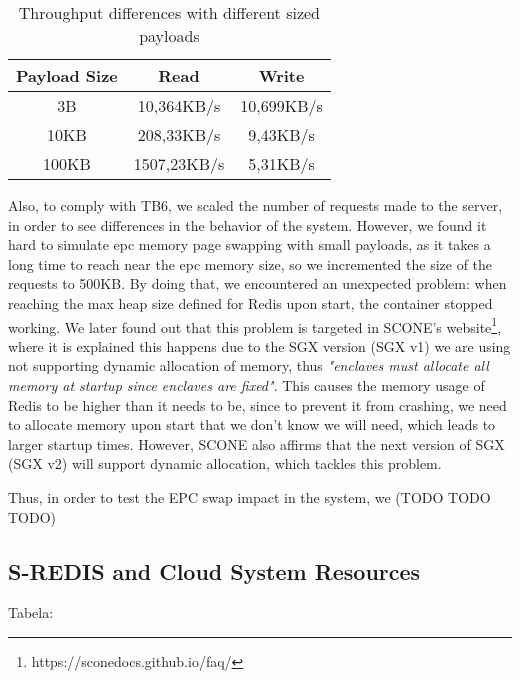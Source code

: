\begin{table}[ht]
	\caption{Throughput differences with different sized payloads} %
	\centering %
	\begin{tabular}{c c c} %
		\hline\hline %
		\textbf{Payload Size} & \textbf{Read} & \textbf{Write} \\ [0.5ex] %
		\hline
		3B & 10,364KB/s & 10,699KB/s\\
		\hline
		10KB & 208,33KB/s & 9,43KB/s \\
		\hline %
		100KB & 1507,23KB/s & 5,31KB/s\\ [1ex] %
		\hline %
	\end{tabular}
	\label{table:throughputPayloads} %
\end{table} 

Also, to comply with TB6, we scaled the number of requests made to the server, in order to see differences in the behavior of the system. However, we found it hard to simulate \gls{epc} memory page swapping with small payloads, as it takes a long time to reach near the \gls{epc} memory size, so we incremented the size of the requests to 500KB. By doing that, we encountered an unexpected problem: when reaching the max heap size defined for Redis upon start, the container stopped working. We later found out that this problem is targeted in SCONE's website\footnote{https://sconedocs.github.io/faq/}, where it is explained this happens due to the SGX version (SGX v1) we are using not supporting dynamic allocation of memory, thus \textit{"enclaves must allocate all memory at startup since enclaves are fixed"}. This causes the memory usage of Redis to be higher than it needs to be, since to prevent it from crashing, we need to allocate memory upon start that we don't know we will need, which leads to larger startup times. However, SCONE also affirms that the next version of SGX (SGX v2) will support dynamic allocation, which tackles this problem. 

Thus, in order to test the EPC swap impact in the system, we (TODO TODO TODO)


\subsection{S-REDIS and Cloud System Resources}

Tabela:

